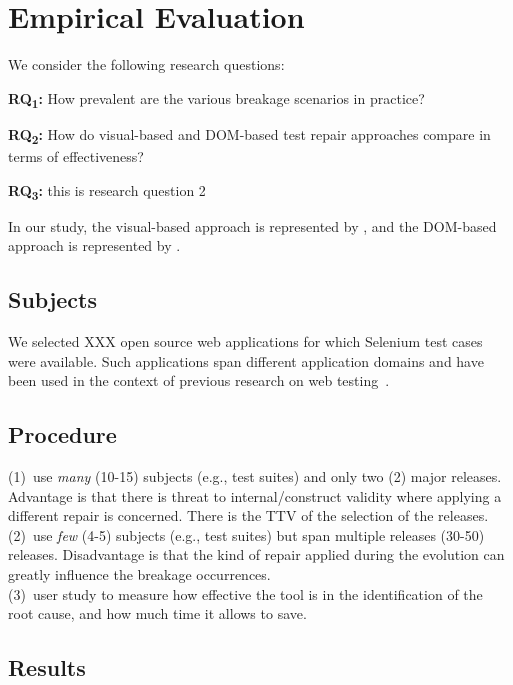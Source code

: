 
\section{Empirical Evaluation}\label{sec:evaluation}

We consider the following research questions:

\noindent
\textbf{RQ\textsubscript{1}:} How prevalent are the various breakage scenarios in practice?

\noindent
\textbf{RQ\textsubscript{2}:} How do visual-based and DOM-based test repair approaches compare in terms of effectiveness?

\noindent%
\textbf{RQ\textsubscript{3}:} this is research question 2

\noindent
In our study, the visual-based approach is represented by \tool, and the DOM-based approach is represented by \water.

\subsection{Subjects}\label{sec:subjects}

We selected XXX open source web applications for which Selenium test cases were available. Such applications span different application domains and have been used in the context of previous research on web testing~\cite{}.

\subsection{Procedure}\label{sec:procedure}

(1)~use \textit{many} (10-15) subjects (e.g., test suites) and only two (2) major releases. Advantage is that there is threat to internal/construct validity where applying a different repair is concerned. There is the TTV of the selection of the releases. \\

\noindent
(2)~use \textit{few} (4-5) subjects (e.g., test suites) but span multiple releases  (30-50) releases. Disadvantage is that the kind of repair applied during the evolution can greatly influence the breakage occurrences. \\

\noindent
(3)~user study to measure how effective the tool is in the identification of the root cause, and how much time it allows to save.

\subsection{Results}\label{sec:results}











